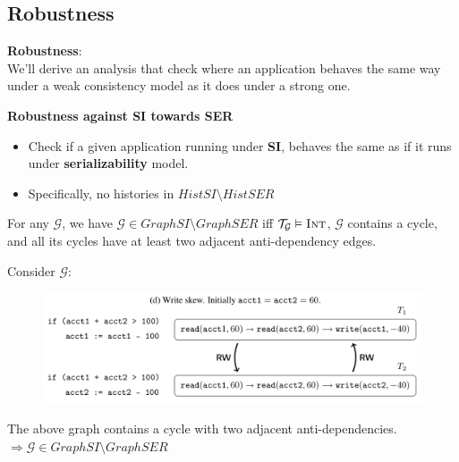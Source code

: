 \documentclass{beamer}
\begin{document}
\subsection{Robustness}

\begin{frame}
	\textbf{Robustness}: \\
	We'll derive an analysis that check where an application behaves the same way under a weak consistency model as it does under a strong one.
\end{frame}

\begin{frame}
	\textbf{Robustness against SI towards SER} \\
	\begin{itemize}
		\item Check if a given application running under \textbf{SI}, behaves the same as if it runs under \textbf{serializability} model.
		\item Specifically, no histories in $HistSI \setminus HistSER$
	\end{itemize}
\end{frame}

\begin{frame}
	\begin{theorem}
		For any $\mathcal{G}$, we have $\mathcal{G} \in GraphSI \setminus GraphSER $ iff $\mathcal{T}_\mathcal{G} \vDash \textsc{Int}$, $\mathcal{G}$ contains a cycle, and all its cycles have at least two adjacent anti-dependency edges.
	\end{theorem}
\end{frame}

\begin{frame}
	Consider $\mathcal{G}$:
	\begin{figure}
		\includegraphics[scale=0.2]{fig2d}
	\end{figure}
	\begin{example}
		The above graph contains a cycle with two adjacent anti-dependencies. \\
		$\Rightarrow \mathcal{G} \in GraphSI \setminus GraphSER$
	\end{example}
\end{frame}
\end{document}
